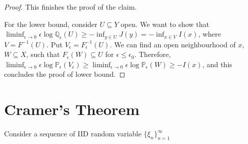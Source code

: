 \documentclass[openany,oneside]{article}
\theoremstyle{definition}
\theoremstyle{remark}
\renewcommand{\P}{\mathbb{P}} %
\begin{document}
\begin{proof}
\par
This finishes the proof of the claim.
\par
For the lower bound, consider $U\subseteq Y$ open. We want to show that $\liminf_{\epsilon\to 0} \epsilon \log \mathbb{Q}_{\epsilon}(U) \ge -\inf_{y\in U} J(y) = -\inf_{x\in V} I(x)$, where $V=F^{-1}(U)$. Put $V_\epsilon = F_\epsilon^{-1}(U)$. We can find an open neighbourhood of $x$, $W\subseteq X$, such that $F_\epsilon(W) \subseteq U$ for $\epsilon \le \epsilon_0$. Therefore, $\liminf_{\epsilon \to 0} \epsilon \log \P_\epsilon (V_\epsilon) \ge \liminf_{\epsilon \to 0} \epsilon \log \P_\epsilon (W) \ge -I(x)$, and this concludes the proof of lower bound.
\end{proof}

\section{Cramer's Theorem}
Consider a sequence of IID random variable $\{\xi_n\}_{n=1}^\infty$
 
\end{document}
